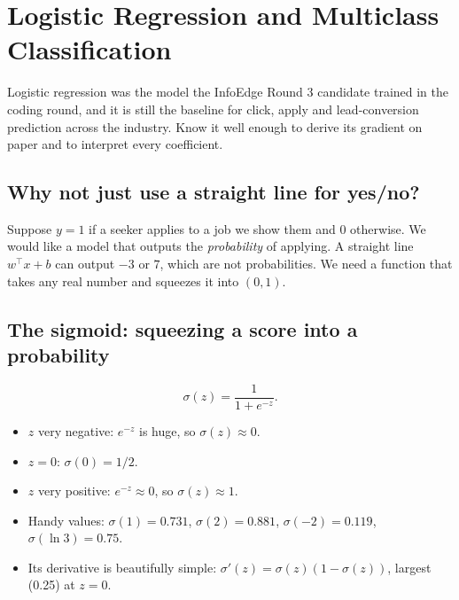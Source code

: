 \chapter{Logistic Regression and Multiclass Classification}

Logistic regression was the model the InfoEdge Round 3 candidate trained in the coding round, and it is
still the baseline for click, apply and lead-conversion prediction across the industry. Know it well enough
to derive its gradient on paper and to interpret every coefficient.

\section{Why not just use a straight line for yes/no?}

Suppose $y = 1$ if a seeker applies to a job we show them and $0$ otherwise. We would like a model that outputs
the \emph{probability} of applying. A straight line $w^\top x + b$ can output $-3$ or $7$, which are not
probabilities. We need a function that takes any real number and squeezes it into $(0,1)$.

\section{The sigmoid: squeezing a score into a probability}

\[ \sigma(z) = \frac{1}{1 + e^{-z}}. \]
\begin{itemize}
\item $z$ very negative: $e^{-z}$ is huge, so $\sigma(z)\approx 0$.
\item $z = 0$: $\sigma(0) = 1/2$.
\item $z$ very positive: $e^{-z}\approx0$, so $\sigma(z)\approx 1$.
\item Handy values: $\sigma(1) = 0.731$, $\sigma(2) = 0.881$, $\sigma(-2) = 0.119$, $\sigma(\ln 3) = 0.75$.
\item Its derivative is beautifully simple: $\sigma'(z) = \sigma(z)(1-\sigma(z))$, largest (0.25) at $z = 0$.
\end{itemize}

\begin{center}
\end{center}

